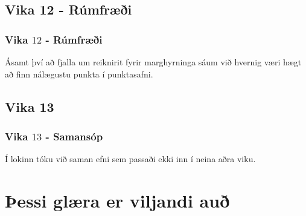 \subsection{Vika 12 - Rúmfræði}
{
    \frametitle{Vika $12$ - Rúmfræði}
    {
        \item<1-> Ásamt því að fjalla um reiknirit fyrir marghyrninga sáum við hvernig væri hægt að finn nálægustu punkta í punktasafni.
        {
            \item<2-> 
            \item<3-> 
            \item<4->  
            \item<5-> 
        }
    }
}

\subsection{Vika 13}
{
    \frametitle{Vika $13$ - Samansóp}
    {
        \item<1-> Í lokinn tóku við saman efni sem passaði ekki inn í neina aðra viku.
        {
            \item<2-> 
            \item<3-> 
            \item<4-> 
        }
    }
}

\section{Þessi glæra er viljandi auð}
{
}


